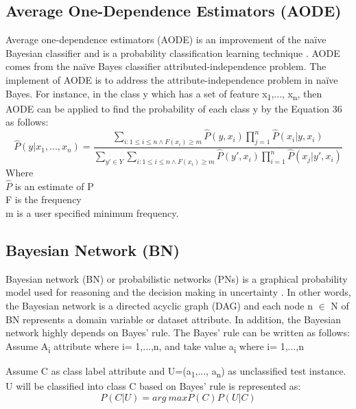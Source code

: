 \documentclass[review]{elsarticle}
\begin{document}
 \subsection{Average One-Dependence Estimators (AODE)}
 	Average one-dependence estimators (AODE) is an improvement of the naïve Bayesian classifier and is a probability classification learning technique \cite{Webb2005}. AODE comes from the naïve Bayes classifier attributed-independence problem. The implement of AODE is to address the attribute-independence problem in naïve Bayes. For instance, in the class y which has a set of feature x\textsubscript{1},..., x\textsubscript{n}, then AODE can be applied to find the probability of each class y by the Equation 36 as follows: 
 	\begin{equation}
 	\hat{P}(y|x_1,...,x_n) = \dfrac{\sum_{i:1\leq i\leq n \wedge F(x_i) \geq m} \hat{P}(y,x_i)\prod_{j=1}^n \hat{P}(x_i|y,x_i)}{ \sum_{y'\in Y}  \sum_{i:1\leq i\leq n \wedge F(x_i) \geq m} \hat{P}(y',x_i) \prod_{i=1}^n \hat{P}(x_j|y',x_i) }
 	\end{equation}
 	Where \\
 	$\hat{P}$ is an estimate of P \\
 	F  is the frequency \\
 	m is a user specified minimum frequency.
 	
 	
 \subsection{Bayesian Network (BN)}
 	Bayesian network (BN) or probabilistic networks (PNs) is a graphical probability model used for reasoning and the decision making in uncertainty \cite{Friedman1998}. In other words, the Bayesian network is a directed acyclic graph (DAG) and each node n $\in$ N of BN represents a domain variable or dataset attribute. In addition, the Bayesian network highly depends on Bayes’ rule. The Bayes' rule can be written as follows: 
 	Assume A\textsubscript{i}  attribute where i= 1,...,n, and take value a\textsubscript{i}  where i= 1,...,n
 	
 	Assume C as class label attribute and U=(a\textsubscript{1},..., a\textsubscript{n}) as unclassified test instance. U will be classified into class  C based on Bayes’ rule is represented as:
 	\begin{equation}
 	P(C|U)=arg\ max P(C)P(U|C)
 	\end{equation}
 	
\end{document}
